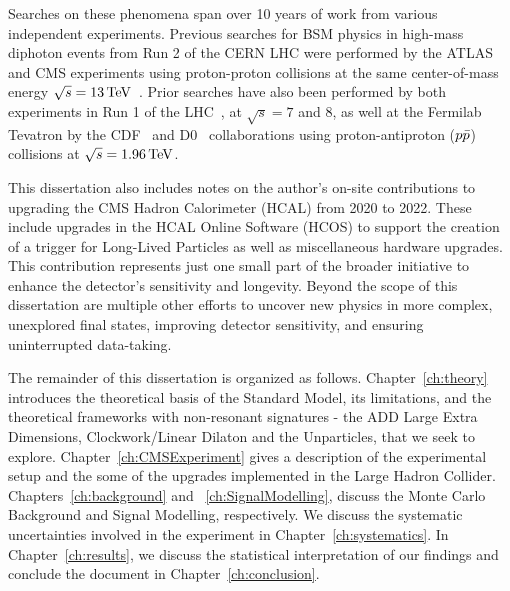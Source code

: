 Searches on these phenomena span over 10 years of work from various independent experiments. Previous searches for BSM physics in high-mass diphoton events from Run 2 of the CERN LHC were performed by the ATLAS and CMS experiments using proton-proton collisions at the same center-of-mass energy $\sqrt{s}=13\,\text{Te\hspace{-.08em}V}$~\cite{Sirunyan:2018wnk,Aad:2021,Aaboud:2017yyg,Khachatryan:2016yec,Aaboud:2016tru,Khachatryan:2016hje}. Prior searches have also been performed by both experiments in Run 1 of the LHC~\cite{Aad:2015mna,Khachatryan:2015qba,Aad:2012cy,Chatrchyan:2011fq,Chatrchyan:2011jx}, at $\sqrt{s}=7$ and 8\TeV, as well at the Fermilab Tevatron by the CDF~\cite{Aaltonen:2011xp,CDF:2002hrr,CDF:2010muc,CDF:2011weq} and D0~\cite{Abazov:2010xh,D0:2000cve,D0:2008hxb,D0:2005srl} collaborations using proton-antiproton ($p\Bar{p}$) collisions at $\sqrt{s}=1.96\,\text{Te\hspace{-.08em}V}$.



 This dissertation also includes notes on the author's on-site contributions to upgrading the CMS Hadron Calorimeter (HCAL) from 2020 to 2022. These include upgrades in the HCAL Online Software (HCOS) to support the creation of a trigger for Long-Lived Particles as well as miscellaneous hardware upgrades. This contribution represents just one small part of the broader initiative to enhance the detector's sensitivity and longevity. Beyond the scope of this dissertation are multiple other efforts to uncover new physics in more complex, unexplored final states, improving detector sensitivity, and ensuring uninterrupted data-taking.

The remainder of this dissertation is organized as follows. Chapter~\ref{ch:theory} introduces the theoretical basis of the Standard Model, its limitations, and the theoretical frameworks with non-resonant signatures - the ADD Large Extra Dimensions, Clockwork/Linear Dilaton and the Unparticles, that we seek to explore. Chapter~\ref{ch:CMSExperiment} gives a description of the experimental setup and the some of the upgrades implemented in the Large Hadron Collider. Chapters~\ref{ch:background} and ~\ref{ch:SignalModelling}, discuss the Monte Carlo Background and Signal Modelling, respectively. We discuss the systematic uncertainties involved in the experiment in Chapter~\ref{ch:systematics}. In Chapter~\ref{ch:results}, we discuss the statistical interpretation of our findings and conclude the document in Chapter~\ref{ch:conclusion}.

